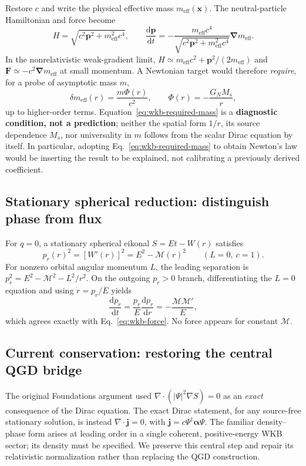 \documentclass[11pt,a4paper]{article}
\newcommand{\dd}{\mathrm d}
\begin{document}
Restore $c$ and write the physical effective mass $m_\mathrm{eff}(\bm x)$.  The neutral-particle Hamiltonian and force become
\begin{equation}\label{eq:wkb-SI}
H=\sqrt{c^2\bm p^2+m_\mathrm{eff}^2c^4},\qquad
\frac{\dd\bm p}{\dd t}=-\frac{m_\mathrm{eff}c^4}{\sqrt{c^2\bm p^2+m_\mathrm{eff}^2c^4}}\bm\nabla m_\mathrm{eff}.
\end{equation}
In the nonrelativistic weak-gradient limit, $H\simeq m_\mathrm{eff}c^2+\bm p^2/(2m_\mathrm{eff})$ and $\bm F\simeq-c^2\bm\nabla m_\mathrm{eff}$ at small momentum.  A Newtonian target would therefore \emph{require}, for a probe of asymptotic mass $m$,
\begin{equation}\label{eq:wkb-required-mass}
\delta m_\mathrm{eff}(r)=\frac{m\Phi(r)}{c^2},\qquad
\Phi(r)=-\frac{G_NM_s}{r},
\end{equation}
up to higher-order terms.  Equation~\eqref{eq:wkb-required-mass} is a \textbf{diagnostic condition, not a prediction}; neither the spatial form $1/r$, its source dependence $M_s$, nor universality in $m$ follows from the scalar Dirac equation by itself.  In particular, adopting Eq.~\eqref{eq:wkb-required-mass} to obtain Newton's law would be inserting the result to be explained, not calibrating a previously derived coefficient.

\subsection{Stationary spherical reduction: distinguish phase from flux}
For $q=0$, a stationary spherical eikonal $S=Et-W(r)$ satisfies
\begin{equation}\label{eq:wkb-radial}
\boxed{p_r(r)^2=[W'(r)]^2=E^2-\mathcal M(r)^2}\qquad (L=0,\ c=1).
\end{equation}
For nonzero orbital angular momentum $L$, the leading separation is $p_r^2=E^2-\mathcal M^2-L^2/r^2$.  On the outgoing $p_r>0$ branch, differentiating the $L=0$ equation and using $\dot r=p_r/E$ yields
\begin{equation}\label{eq:wkb-radial-force}
\frac{\dd p_r}{\dd t}=\frac{p_r}{E}\frac{\dd p_r}{\dd r}
=-\frac{\mathcal M\mathcal M'}{E},
\end{equation}
which agrees exactly with Eq.~\eqref{eq:wkb-force}.  No force appears for constant $\mathcal M$.

\subsection{Current conservation: restoring the central QGD bridge}\label{sec:qgd-corrected-flux}
The original Foundations argument used $\nabla\cdot(|\Psi|^2\nabla S)=0$ as an \emph{exact} consequence of the Dirac equation.  The exact Dirac statement, for any source-free stationary solution, is instead $\nabla\cdot\bm j=0$, with $\bm j=c\Psi^\dagger\bm\alpha\Psi$.  The familiar density--phase form arises at leading order in a single coherent, positive-energy WKB sector; its density must be specified.  We preserve this central step and repair its relativistic normalization rather than replacing the QGD construction.
\end{document}
